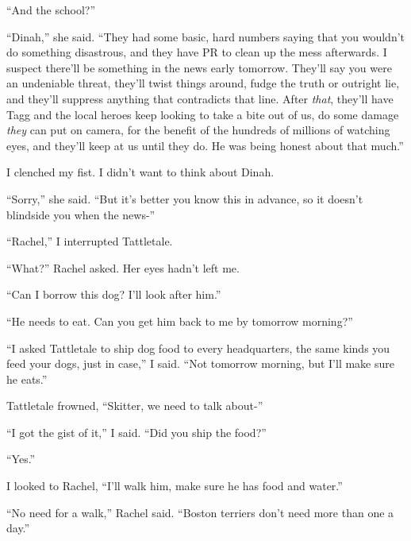 ``And the school?''



``Dinah,'' she said.  ``They had some basic, hard numbers saying that you wouldn't do something disastrous, and they have PR to clean up the mess afterwards.  I suspect there'll be something in the news early tomorrow.  They'll say you were an undeniable threat, they'll twist things around, fudge the truth or outright lie, and they'll suppress anything that contradicts that line.  After \emph{that}, they'll have Tagg and the local heroes keep looking to take a bite out of us, do some damage \emph{they} can put on camera, for the benefit of the hundreds of millions of watching eyes, and they'll keep at us until they do.  He was being honest about that much.''



I clenched my fist.  I didn't want to think about Dinah.



``Sorry,'' she said.  ``But it's better you know this in advance, so it doesn't blindside you when the news-''



``Rachel,'' I interrupted Tattletale.



``What?''  Rachel asked.  Her eyes hadn't left me.



``Can I borrow this dog?  I'll look after him.''



``He needs to eat.  Can you get him back to me by tomorrow morning?''



``I asked Tattletale to ship dog food to every headquarters, the same kinds you feed your dogs, just in case,'' I said.  ``Not tomorrow morning, but I'll make sure he eats.''



Tattletale frowned, ``Skitter, we need to talk about-''



``I got the gist of it,'' I said.  ``Did you ship the food?''



``Yes.''



I looked to Rachel, ``I'll walk him, make sure he has food and water.''



``No need for a walk,'' Rachel said.  ``Boston terriers don't need more than one a day.''



